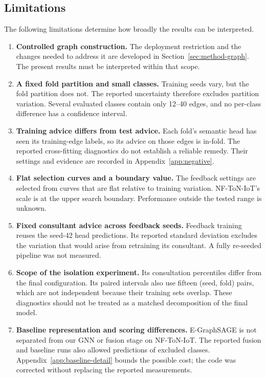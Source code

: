 \subsection{Limitations}
\label{sec:disc-limitations}

The following limitations determine how broadly the results can be interpreted.

\begin{enumerate}
    \item \textbf{Controlled graph construction.} The deployment restriction and the changes needed to address it are developed in Section~\ref{sec:method-graph}. The present results must be interpreted within that scope.

    \item \textbf{A fixed fold partition and small classes.} Training seeds vary, but the fold partition does not. The reported uncertainty therefore excludes partition variation. Several evaluated classes contain only 12--40 edges, and no per-class difference has a confidence interval.

    \item \textbf{Training advice differs from test advice.} Each fold's semantic head has seen its training-edge labels, so its advice on those edges is in-fold. The reported cross-fitting diagnostics do not establish a reliable remedy. Their settings and evidence are recorded in Appendix~\ref{app:negative}.

    \item \textbf{Flat selection curves and a boundary value.} The feedback settings are selected from curves that are flat relative to training variation. NF-ToN-IoT's scale is at the upper search boundary. Performance outside the tested range is unknown.

    \item \textbf{Fixed consultant advice across feedback seeds.} Feedback training reuses the seed-42 head predictions. Its reported standard deviation excludes the variation that would arise from retraining its consultant. A fully re-seeded pipeline was not measured.

    \item \textbf{Scope of the isolation experiment.} Its consultation percentiles differ from the final configuration. Its paired intervals also use fifteen (seed, fold) pairs, which are not independent because their training sets overlap. These diagnostics should not be treated as a matched decomposition of the final model.

    \item \textbf{Baseline representation and scoring differences.} E-GraphSAGE is not separated from our GNN or fusion stage on NF-ToN-IoT. The reported fusion and baseline runs also allowed predictions of excluded classes. Appendix~\ref{app:baseline-detail} bounds the possible cost; the code was corrected without replacing the reported measurements.


\end{enumerate}
